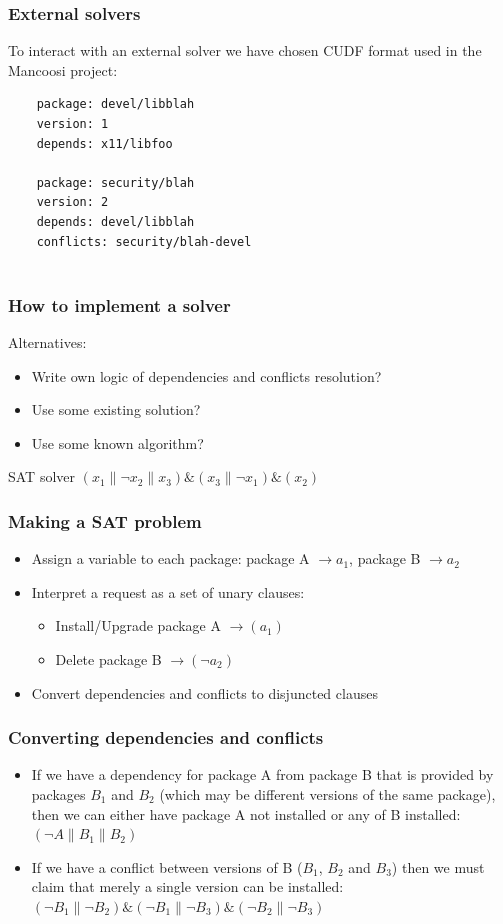 \documentclass{beamer}
\begin{document}
\begin{frame}[fragile]
\frametitle{External solvers}
To interact with an external solver we have chosen CUDF format used in the
Mancoosi project:
\bigskip
{\tiny
	\begin{verbatim}
	package: devel/libblah
	version: 1
	depends: x11/libfoo

	package: security/blah
	version: 2
	depends: devel/libblah
	conflicts: security/blah-devel
	
	\end{verbatim}
}
\end{frame}

\begin{frame}
\frametitle{How to implement a solver}

Alternatives:
\begin{itemize}
  \item Write own logic of dependencies and conflicts resolution?
  \pause
  \item Use some existing solution?
  \pause
  \item Use some known algorithm?
  \pause
\end{itemize}
\bigskip
{\large SAT solver}
\bigskip
$(x_1 \| \neg x_2 \| x_3) \& (x_3 \| \neg x_1) \& (x_2)$
\end{frame}

\begin{frame}
\frametitle{Making a SAT problem}
\begin{itemize}
  \item Assign a variable to each package: 
  package A $\to a_1$, package B $\to a_2$
  \item Interpret a request as a set of unary clauses:
  \begin{itemize}
    \item Install/Upgrade package A $\to (a_1)$
    \item Delete package B $\to (\neg a_2)$
  \end{itemize}
  \item Convert dependencies and conflicts to disjuncted clauses
\end{itemize}

\end{frame}

\begin{frame}
\frametitle{Converting dependencies and conflicts}
\begin{itemize}
  \item If we have a dependency for package A from package B that is provided by
packages $B_1$ and $B_2$ (which may be different versions of the same package),
then we can either have package A not installed or any of B installed:
  \bigskip
$(\neg A \| B_1 \| B_2)$
  \item If we have a conflict between versions of B ($B_1$, $B_2$ and $B_3$)
 then we must claim that merely a single version can be installed:
  \bigskip
$(\neg B_1 \| \neg B_2) \& (\neg B_1 \| \neg B_3) \& (\neg B_2 \| \neg
B_3)$
\end{itemize}
\end{frame}
\end{document}
